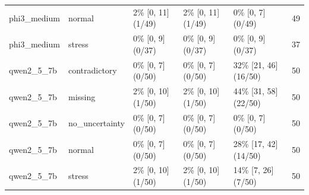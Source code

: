 \begin{tabular}{lllllr}
phi3\_medium & normal & 2\% [0, 11] (1/49) & 2\% [0, 11] (1/49) & 0\% [0, 7] (0/49) & 49 \\
phi3\_medium & stress & 0\% [0, 9] (0/37) & 0\% [0, 9] (0/37) & 0\% [0, 9] (0/37) & 37 \\
qwen2\_5\_7b & contradictory & 0\% [0, 7] (0/50) & 0\% [0, 7] (0/50) & 32\% [21, 46] (16/50) & 50 \\
qwen2\_5\_7b & missing & 2\% [0, 10] (1/50) & 2\% [0, 10] (1/50) & 44\% [31, 58] (22/50) & 50 \\
qwen2\_5\_7b & no\_uncertainty & 0\% [0, 7] (0/50) & 0\% [0, 7] (0/50) & 0\% [0, 7] (0/50) & 50 \\
qwen2\_5\_7b & normal & 0\% [0, 7] (0/50) & 0\% [0, 7] (0/50) & 28\% [17, 42] (14/50) & 50 \\
qwen2\_5\_7b & stress & 2\% [0, 10] (1/50) & 2\% [0, 10] (1/50) & 14\% [7, 26] (7/50) & 50 \\
\bottomrule
\end{tabular}
